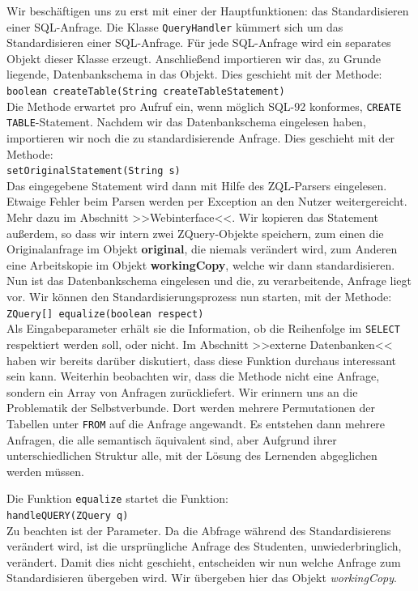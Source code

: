 Wir beschäftigen uns zu erst mit einer der Hauptfunktionen: das Standardisieren einer SQL-Anfrage. Die Klasse \verb|QueryHandler| kümmert sich um das Standardisieren einer SQL-Anfrage. Für jede SQL-Anfrage wird ein separates Objekt dieser Klasse erzeugt. Anschließend importieren wir das, zu Grunde liegende, Datenbankschema in das Objekt. Dies geschieht mit der Methode: \\\verb|boolean createTable(String createTableStatement)|\\
Die Methode erwartet pro Aufruf ein, wenn möglich SQL-92 konformes, \verb|CREATE TABLE|-Statement. Nachdem wir das Datenbankschema eingelesen haben, importieren wir noch die zu standardisierende Anfrage. Dies geschieht mit der Methode:\\\verb|setOriginalStatement(String s)|\\ Das eingegebene Statement wird dann mit Hilfe des ZQL-Parsers eingelesen. Etwaige Fehler beim Parsen werden per Exception an den Nutzer weitergereicht. Mehr dazu im Abschnitt >>Webinterface<<. Wir kopieren das Statement außerdem, so dass wir intern zwei ZQuery-Objekte speichern, zum einen die Originalanfrage im Objekt \textbf{original}, die niemals verändert wird, zum Anderen eine Arbeitskopie im Objekt \textbf{workingCopy}, welche wir dann standardisieren. Nun ist das Datenbankschema eingelesen und die, zu verarbeitende, Anfrage liegt vor. Wir können den Standardisierungsprozess nun starten, mit der Methode: \\\verb|ZQuery[] equalize(boolean respect)|\\ 
Als Eingabeparameter erhält sie die Information, ob die Reihenfolge im \verb|SELECT| respektiert werden soll, oder nicht. Im Abschnitt >>externe Datenbanken<< haben wir bereits darüber diskutiert, dass diese Funktion durchaus interessant sein kann. Weiterhin beobachten wir, dass die Methode nicht eine Anfrage, sondern ein Array von Anfragen zurückliefert. Wir erinnern uns an die Problematik der Selbstverbunde. Dort werden mehrere Permutationen der Tabellen unter \verb|FROM| auf die Anfrage angewandt. Es entstehen dann mehrere Anfragen, die alle semantisch äquivalent sind, aber Aufgrund ihrer unterschiedlichen Struktur alle, mit der Lösung des Lernenden abgeglichen werden müssen.

Die Funktion \verb|equalize| startet die Funktion:\\
\verb|handleQUERY(ZQuery q)|\\Zu beachten ist der Parameter. Da die Abfrage während des Standardisierens verändert wird, ist die ursprüngliche Anfrage des Studenten, unwiederbringlich, verändert. Damit dies nicht geschieht, entscheiden wir nun welche Anfrage zum Standardisieren übergeben wird. Wir übergeben hier das Objekt \textit{workingCopy}.

